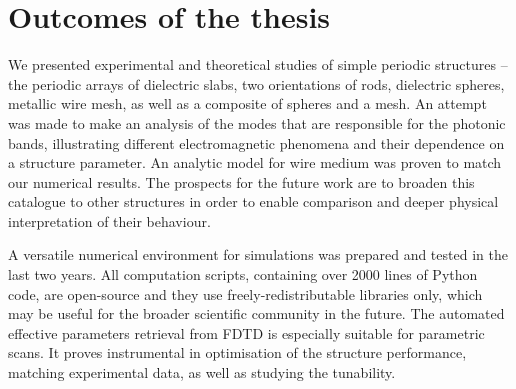 
\section{Outcomes of the thesis}

We presented experimental and theoretical studies of simple periodic structures -- the periodic arrays of dielectric slabs, two orientations of rods, dielectric spheres, metallic wire mesh, as well as a composite of spheres and a mesh. An attempt was made to make an analysis of the modes that are responsible for the photonic bands, illustrating different electromagnetic phenomena and their dependence on a structure parameter. An analytic model for wire medium was proven to match our numerical results.
The prospects for the future work are to broaden this catalogue to other structures in order to enable comparison and deeper physical interpretation of their behaviour. 

A versatile numerical environment for simulations was prepared and tested in the last two years. All computation scripts, containing over 2000 lines of Python code, are open-source and they use freely-redistributable libraries only, which may be useful for the broader scientific community in the future. 
The automated effective parameters retrieval from FDTD is especially suitable for parametric scans. It proves instrumental in optimisation of the structure performance, matching experimental data, as well as studying the tunability.


